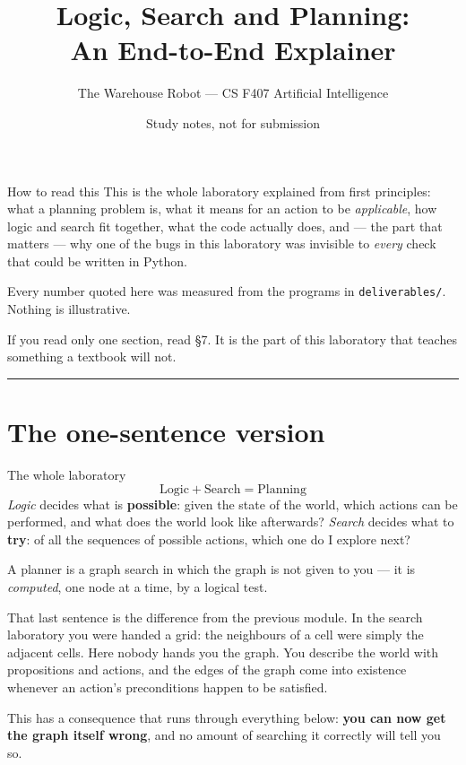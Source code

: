\documentclass[11pt,a4paper]{article}
\title{\vspace{-1.5cm}\textbf{Logic, Search and Planning:\\An End-to-End Explainer}}
\author{The Warehouse Robot --- CS F407 Artificial Intelligence}
\date{Study notes, not for submission}
\begin{document}
\maketitle

\begin{keyidea}{How to read this}
This is the whole laboratory explained from first principles: what a planning
problem is, what it means for an action to be \emph{applicable}, how logic and
search fit together, what the code actually does, and --- the part that matters
--- why one of the bugs in this laboratory was invisible to \emph{every} check
that could be written in Python.

Every number quoted here was measured from the programs in
\texttt{deliverables/}. Nothing is illustrative.

If you read only one section, read \S7. It is the part of this laboratory that
teaches something a textbook will not.
\end{keyidea}

\tableofcontents
\vspace{6pt}
\hrule

\section{The one-sentence version}

\begin{keyidea}{The whole laboratory}
\[
\boxed{\text{Logic} + \text{Search} = \text{Planning}}
\]
\emph{Logic} decides what is \textbf{possible}: given the state of the world,
which actions can be performed, and what does the world look like afterwards?
\emph{Search} decides what to \textbf{try}: of all the sequences of possible
actions, which one do I explore next?

A planner is a graph search in which the graph is not given to you --- it is
\emph{computed}, one node at a time, by a logical test.
\end{keyidea}

That last sentence is the difference from the previous module. In the search
laboratory you were handed a grid: the neighbours of a cell were simply the
adjacent cells. Here nobody hands you the graph. You describe the world with
propositions and actions, and the edges of the graph come into existence
whenever an action's preconditions happen to be satisfied.

This has a consequence that runs through everything below: \textbf{you can now
get the graph itself wrong}, and no amount of searching it correctly will tell
you so.
\end{document}
